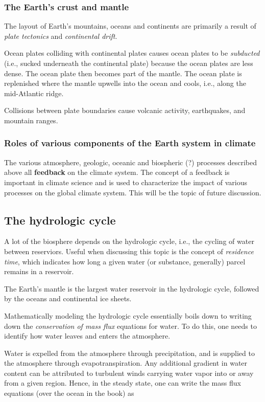 \documentclass[11pt]{article}
\numberwithin{equation}{section}
\begin{document}
\subsubsection{The Earth's crust and mantle}
The layout of Earth's mountains, oceans and continents are primarily a result of \textit{plate tectonics} and \textit{continental drift}. 

Ocean plates colliding with continental plates causes ocean plates to be \textit{subducted} (i.e., sucked underneath the continental plate) because the ocean plates are less dense. The ocean plate then becomes part of the mantle. The ocean plate is replenished where the mantle upwells into the ocean and cools, i.e., along the mid-Atlantic ridge.

Collisions between plate boundaries cause volcanic activity, earthquakes, and mountain ranges.

\subsubsection{Roles of various components of the Earth system in climate}
The various atmosphere, geologic, oceanic and biospheric (?) processes described above all \textbf{feedback} on the climate system. The concept of a feedback is important in climate science and is used to characterize the impact of various processes on the global climate system. This will be the topic of future discussion.

\subsection{The hydrologic cycle}
A lot of the biosphere depends on the hydrologic cycle, i.e., the cycling of water between reserviors. Useful when discussing this topic is the concept of \textit{residence time}, which indicates how long a given water (or substance, generally) parcel remains in a reservoir. 

The Earth's mantle is the largest water reservoir in the hydrologic cycle, followed by the oceans and continental ice sheets.

Mathematically modeling the hydrologic cycle essentially boils down to writing down the \textit{conservation of mass flux} equations for water. To do this, one needs to identify how water leaves and enters the atmosphere. 

Water is expelled from the atmosphere through precipitation, and is supplied to the atmosphere through evapotranspiration. Any additional gradient in water content can be attributed to turbulent winds carrying water vapor into or away from a given region. Hence, in the steady state, one can write the mass flux equations (over the ocean in the book) as 
\end{document}
